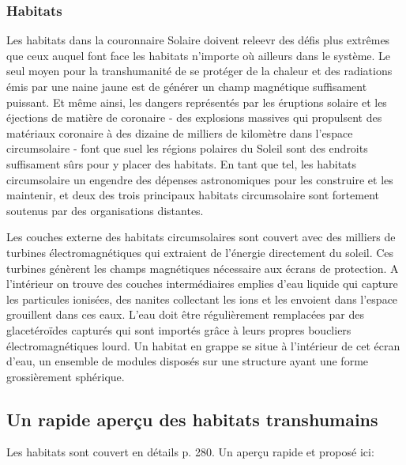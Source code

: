 \subsubsection{Habitats} \label{sec:habitats-1} 

Les habitats dans la couronnaire Solaire doivent releevr des défis plus extrêmes que ceux auquel font face les habitats n'importe où ailleurs dans le système. Le seul moyen pour la transhumanité de se protéger de la chaleur et des radiations émis par une naine jaune est de générer un champ magnétique suffisament puissant. Et même ainsi, les dangers représentés par les éruptions solaire et les éjections de matière de coronaire - des explosions massives qui propulsent des matériaux coronaire à des dizaine de milliers de kilomètre dans l'espace circumsolaire - font que suel les régions polaires du Soleil sont des endroits suffisament sûrs pour y placer des habitats. En tant que tel, les habitats circumsolaire un engendre des dépenses astronomiques pour les construire et les maintenir, et deux des trois principaux habitats circumsolaire sont fortement soutenus par des organisations distantes. 

Les couches externe des habitats circumsolaires sont couvert avec des milliers de turbines électromagnétiques qui extraient de l'énergie directement du soleil. Ces turbines génèrent les champs magnétiques nécessaire aux écrans de protection. A l'intérieur on trouve des couches intermédiaires emplies d'eau liquide qui capture les particules ionisées, des nanites collectant les ions et les envoient dans l'espace grouillent dans ces eaux. L'eau doit être régulièrement remplacées par des glacetéroïdes capturés qui sont importés grâce à leurs propres boucliers électromagnétiques lourd. Un habitat en grappe se situe à l'intérieur de cet écran d'eau, un ensemble de modules disposés sur une structure ayant une forme grossièrement sphérique. 

\subsection{Un rapide aperçu des habitats transhumains} \label{sec:quick-prim-transh} 

Les habitats sont couvert en détails p. 280. Un aperçu rapide et proposé ici: 

